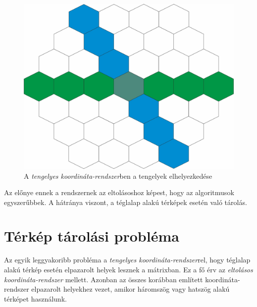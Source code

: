 \begin{figure}[h!]
\centering
\includegraphics[scale=0.2]{kepek/AxialCoord.jpg}
\caption{A \textit{tengelyes koordináta-rendszer}ben a tengelyek elhelyezkedése}
\label{fig:AxialCoord}
\end{figure}

Az előnye ennek a rendszernek az eltolásoshoz képest, hogy az algoritmusok egyszerűbbek. A hátránya viszont, a téglalap alakú térképek esetén való tárolás. 

\section{Térkép tárolási probléma}


Az egyik leggyakoribb probléma a \textit{tengelyes koordináta-rendszer}rel, hogy téglalap alakú térkép esetén elpazarolt helyek lesznek a mátrixban. Ez a fő érv az \textit{eltolásos koordináta-rendszer} mellett. Azonban az összes korábban említett koordináta-rendszer elpazarolt helyekhez vezet, amikor háromszög vagy hatszög alakú térképet használunk.


